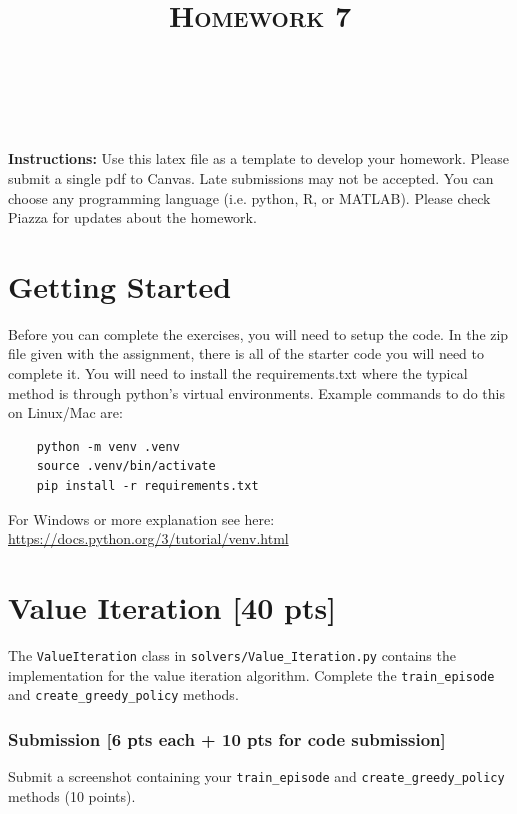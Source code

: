 \documentclass[a4paper]{article}
\title{\textsc{Homework 7}} %
\author{
\red{$>>$NAME HERE$<<$} \\
\red{$>>$ID HERE$<<$}\\
}
\date{}
\theoremstyle{definition}
\begin{document}
\maketitle 

\textbf{Instructions:}
Use this latex file as a template to develop your homework. Please submit a single pdf to Canvas. Late submissions may not be accepted. You can choose any programming language (i.e. python, R, or MATLAB). Please check Piazza for updates about the homework.
\vspace{0.1in}

\section{Getting Started}
Before you can complete the exercises, you will need to setup the code.
%
In the zip file given with the assignment, there is all of the starter code you will need to complete it.
%
You will need to install the requirements.txt where the typical method is through python's virtual environments.
%
Example commands to do this on Linux/Mac are:
\begin{verbatim}
    python -m venv .venv
    source .venv/bin/activate
    pip install -r requirements.txt 
\end{verbatim}
%

For Windows or more explanation see here: \url{https://docs.python.org/3/tutorial/venv.html}

\section{Value Iteration [40 pts]}

The \verb|ValueIteration| class in \verb|solvers/Value_Iteration.py| contains the implementation for the value iteration algorithm. Complete the \verb|train_episode| and \verb|create_greedy_policy| methods.

\subsubsection*{Submission [6 pts each + 10 pts for code submission]}

Submit a screenshot containing your \verb|train_episode| and \verb|create_greedy_policy| methods (10 points).
\end{document}
